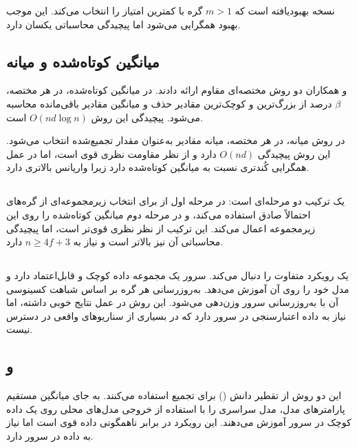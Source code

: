  \cite{blanchard2017machine} نسخه بهبودیافته است که $m > 1$ گره با کمترین امتیاز را انتخاب می‌کند. این موجب بهبود همگرایی می‌شود اما پیچیدگی محاسباتی یکسان دارد.

\subsection{میانگین کوتاه‌شده و میانه}

 و همکاران \cite{yin2018byzantine} دو روش مختصه‌ای مقاوم ارائه دادند. در میانگین کوتاه‌شده، در هر مختصه، $\beta$ درصد از بزرگ‌ترین و کوچک‌ترین مقادیر حذف و میانگین مقادیر باقی‌مانده محاسبه می‌شود. پیچیدگی این روش $O(nd \log n)$ است.

در روش میانه، در هر مختصه، میانه مقادیر به‌عنوان مقدار تجمیع‌شده انتخاب می‌شود. این روش پیچیدگی $O(nd)$ دارد و از نظر مقاومت نظری قوی است، اما در عمل همگرایی کُندتری نسبت به میانگین کوتاه‌شده دارد زیرا واریانس بالاتری دارد.

\subsection{}

 \cite{el2018byzantine} یک ترکیب دو مرحله‌ای است: در مرحله اول از  برای انتخاب زیرمجموعه‌ای از گره‌های احتمالاً صادق استفاده می‌کند، و در مرحله دوم میانگین کوتاه‌شده را روی این زیرمجموعه اعمال می‌کند. این ترکیب از نظر نظری قوی‌تر است، اما پیچیدگی محاسباتی آن نیز بالاتر است و نیاز به $n \geq 4f + 3$ دارد.

\subsection{}

 \cite{cao2020fltrust} یک رویکرد متفاوت را دنبال می‌کند. سرور یک مجموعه داده کوچک و قابل‌اعتماد دارد و مدل خود را روی آن آموزش می‌دهد. به‌روزرسانی هر گره بر اساس شباهت کسینوسی آن با به‌روزرسانی سرور وزن‌دهی می‌شود. این روش در عمل نتایج خوبی داشته، اما نیاز به داده اعتبارسنجی در سرور دارد که در بسیاری از سناریوهای واقعی در دسترس نیست.

\subsection{ و }

این دو روش \cite{lin2020ensemble, chen2021fedbe} از تقطیر دانش () برای تجمیع استفاده می‌کنند. به جای میانگین مستقیم پارامترهای مدل، مدل سراسری را با استفاده از خروجی مدل‌های محلی روی یک داده کوچک در سرور آموزش می‌دهند. این رویکرد در برابر ناهمگونی داده قوی است اما نیاز به داده در سرور دارد.


